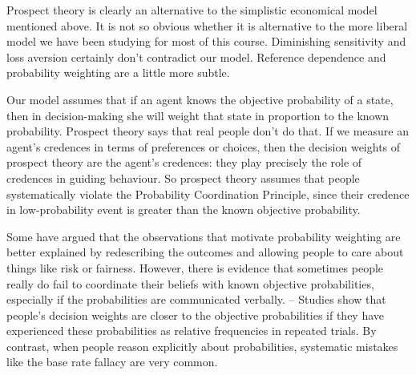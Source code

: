 Prospect theory is clearly an alternative to the simplistic economical
model mentioned above. It is not so obvious whether it is alternative
to the more liberal model we have been studying for most of this
course. Diminishing sensitivity and loss aversion certainly don't
contradict our model. Reference dependence and probability weighting
are a little more subtle.

Our model assumes that if an agent knows the objective probability of
a state, then in decision-making she will weight that state in
proportion to the known probability. Prospect theory says that real
people don't do that. If we measure an agent's credences in terms of
preferences or choices, then the decision weights of prospect theory
are the agent's credences: they play precisely the role of credences
in guiding behaviour. So prospect theory assumes that people
systematically violate the Probability Coordination Principle, since
their credence in low-probability event is greater than the known
objective probability.

Some have argued that the observations that motivate probability
weighting are better explained by redescribing the outcomes and
allowing people to care about things like risk or fairness. However,
there is evidence that sometimes people really do fail to coordinate
their beliefs with known objective probabilities, especially if the
probabilities are communicated verbally. -- Studies show that people's
decision weights are closer to the objective probabilities if they
have experienced these probabilities as relative frequencies in
repeated trials.%
By contrast, when people reason explicitly about probabilities,
systematic mistakes like the base rate fallacy are very common. 



